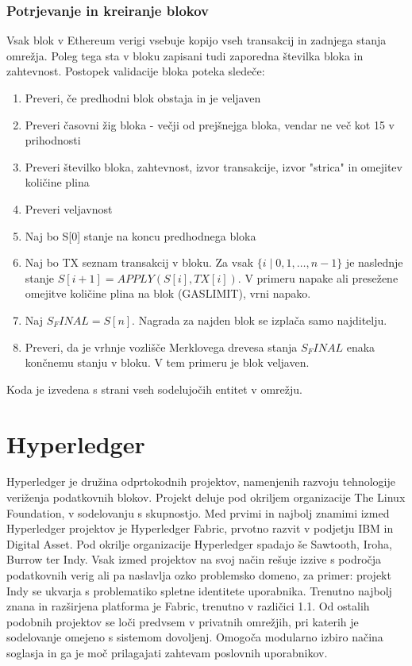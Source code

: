 \documentclass[a4paper, 12pt]{book}
\begin{document}
\subsubsection{Potrjevanje in kreiranje blokov}
Vsak blok v Ethereum verigi vsebuje kopijo vseh transakcij in zadnjega stanja omrežja.
Poleg tega sta v bloku zapisani tudi zaporedna številka bloka in zahtevnost.
Postopek validacije bloka poteka sledeče:
\begin{enumerate}
\item Preveri, če predhodni blok obstaja in je veljaven
\item Preveri časovni žig bloka - večji od prejšnejga bloka, vendar ne več kot 15 v prihodnosti
\item Preveri številko bloka, zahtevnost, izvor transakcije, izvor "strica" in omejitev količine plina
\item Preveri veljavnost 
\item Naj bo S[0] stanje na koncu predhodnega bloka
\item Naj bo TX seznam transakcij v bloku. Za vsak 
$\{i \mid 0,1,\dots, n-1\}$
je naslednje stanje
 $S[i+1] = APPLY(S[i], TX[i])$.
V primeru napake ali presežene omejitve količine plina na blok (GASLIMIT), vrni napako.
\item Naj $S_FINAL = S[n]$. Nagrada za najden blok se izplača samo najditelju.
\item Preveri, da je vrhnje vozlišče Merklovega drevesa stanja $S_FINAL$ enaka končnemu stanju v bloku. V tem primeru je blok veljaven.
\end{enumerate}

Koda je izvedena s strani vseh sodelujočih entitet v omrežju.

\section{Hyperledger}
Hyperledger je družina odprtokodnih projektov, namenjenih razvoju tehnologije veriženja podatkovnih blokov.
Projekt deluje pod okriljem organizacije The Linux Foundation, v sodelovanju s skupnostjo.
Med prvimi in najbolj znamimi izmed Hyperledger projektov je Hyperledger Fabric, prvotno razvit v podjetju IBM in Digital Asset.
Pod okrilje organizacije Hyperledger spadajo še Sawtooth, Iroha, Burrow ter Indy.
Vsak izmed projektov na svoj način rešuje izzive s področja podatkovnih verig ali pa naslavlja ozko problemsko domeno, za primer: projekt Indy se ukvarja s problematiko spletne identitete uporabnika. \cite{hyperledgerWeb}
Trenutno najbolj znana in razširjena platforma je Fabric, trenutno v različici 1.1.
Od ostalih podobnih projektov se loči predvsem v privatnih omrežjih, pri katerih je sodelovanje omejeno s sistemom dovoljenj.
Omogoča modularno izbiro načina soglasja in ga je moč prilagajati zahtevam poslovnih uporabnikov. \cite{hyperledgerIbm}
\end{document}
